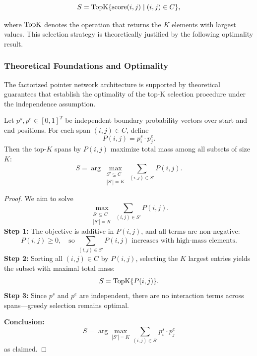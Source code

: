 \begin{equation}
S = \operatorname{TopK}\{\mathrm{score}(i,j) \mid (i,j) \in C\},
\label{eq:topk-selection}
\end{equation}

where \(\operatorname{TopK}\) denotes the operation that returns the \(K\) elements with largest values. This selection strategy is theoretically justified by the following optimality result.

\subsubsection{Theoretical Foundations and Optimality}
\label{sec:span-optimality}

The factorized pointer network architecture is supported by theoretical guarantees that establish the optimality of the top-K selection procedure under the independence assumption.

\begin{proposition}
	\label{prop:greedy-span-optimality}
	Let \(p^s,p^e\in[0,1]^T\) be independent boundary probability vectors over start and end positions. For each span \((i,j)\in C\), define
	\begin{equation}
	P(i,j) = p^s_i \cdot p^e_j.
	\label{eq:span-probability}
	\end{equation}
	Then the top-\(K\) spans by \(P(i,j)\) maximize total mass among all subsets of size \(K\):
	\begin{equation}
	S = \arg\max_{\substack{S'\subseteq C\\|S'|=K}} \sum_{(i,j)\in S'} P(i,j).
	\label{eq:optimal-selection}
	\end{equation}
\end{proposition}

\begin{proof}
	We aim to solve
	\begin{equation}
	\max_{\substack{S'\subseteq C\\|S'|=K}} \sum_{(i,j)\in S'} P(i,j).
	\label{eq:optimization-objective}
	\end{equation}
	\textbf{Step 1:} The objective is additive in \(P(i,j)\), and all terms are non-negative:
	\begin{equation}
	P(i,j)\ge0,\quad \text{so } \sum_{(i,j)\in S'} P(i,j) \text{ increases with high-mass elements}.
	\label{eq:non-negative-property}
	\end{equation}
	\textbf{Step 2:} Sorting all \((i,j)\in C\) by \(P(i,j)\), selecting the \(K\) largest entries yields the subset with maximal total mass:
	\begin{equation}
	S = \operatorname{TopK}\{P(i,j)\}.
	\label{eq:greedy-selection}
	\end{equation}
	\textbf{Step 3:} Since \(p^s\) and \(p^e\) are independent, there are no interaction terms across spans---greedy selection remains optimal.
	
	\textbf{Conclusion:}
	\begin{equation}
	\boxed{
		S = \arg\max_{|S'|=K} \sum_{(i,j)\in S'} p^s_i \cdot p^e_j
	}
	\label{eq:final-optimality}
	\end{equation}
	as claimed.
\end{proof}

